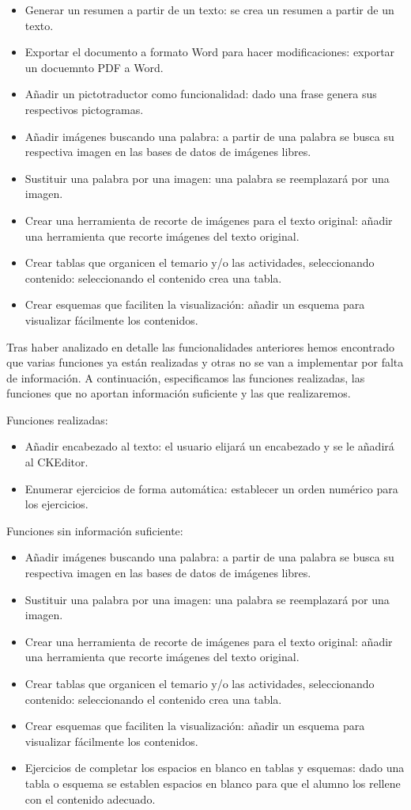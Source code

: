 \begin{itemize}
  \item Generar un resumen a partir de un texto: se crea un resumen a partir de un texto.
  \item Exportar el documento a formato Word para hacer modificaciones: exportar un docuemnto PDF a Word.
  \item Añadir un pictotraductor como funcionalidad: dado una frase genera sus respectivos pictogramas.
  \item Añadir imágenes buscando una palabra: a partir de una palabra se busca su respectiva imagen en las bases de datos de imágenes libres.
  \item Sustituir una palabra por una imagen: una palabra se reemplazará por una imagen.
  \item Crear una herramienta de recorte de imágenes para el texto original: añadir una herramienta que recorte imágenes del texto original.
  \item Crear tablas que organicen el temario y/o las actividades, seleccionando contenido: seleccionando el contenido crea una tabla.
  \item Crear esquemas que faciliten la visualización: añadir un esquema para visualizar fácilmente los contenidos.
\end{itemize}
Tras haber analizado en detalle las funcionalidades anteriores hemos encontrado que varias funciones ya están realizadas y otras no se van a implementar por falta de información. A continuación, especificamos las funciones realizadas, las funciones que no aportan información suficiente y las que realizaremos.

Funciones realizadas:
  \begin{itemize}
    \item Añadir encabezado al texto: el usuario elijará un encabezado y se le añadirá al CKEditor.
    \item Enumerar ejercicios de forma automática: establecer un orden numérico para los ejercicios.
  \end{itemize}
Funciones sin información suficiente:
\begin{itemize}
  \item Añadir imágenes buscando una palabra: a partir de una palabra se busca su respectiva imagen en las bases de datos de imágenes libres.
  \item Sustituir una palabra por una imagen: una palabra se reemplazará por una imagen.
  \item Crear una herramienta de recorte de imágenes para el texto original: añadir una herramienta que recorte imágenes del texto original.
  \item Crear tablas que organicen el temario y/o las actividades, seleccionando contenido: seleccionando el contenido crea una tabla.
  \item Crear esquemas que faciliten la visualización: añadir un esquema para visualizar fácilmente los contenidos.
  \item Ejercicios de completar los espacios en blanco en tablas y esquemas: dado una tabla o esquema se establen espacios en blanco para que el alumno los rellene con el contenido adecuado.
\end{itemize}

